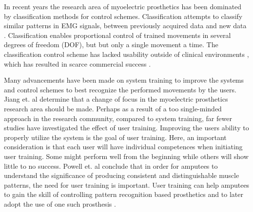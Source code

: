 In recent years the research area of myoelectric prosthetics has been dominated by classification methods for control schemes. Classification attempts to classify similar patterns in EMG signals, between previously acquired data and new data \cite{Mendez2017}. Classification enables proportional control of trained movements in several degrees of freedom (DOF), but but only a single movement a time. The classification control scheme has lacked usability outside of clinical environments \cite{Scheme2010}, which has resulted in scarce commercial success \cite{Jiang2012}.

Many advancements have been made on system training to improve the systems and control schemes to best recognize the performed movements by the users. Jiang et. al \cite{Jiang2012} determine that a change of focus in the myoelectric prosthetics research area should be made. Perhaps as a result of a too single-minded approach in the research community, compared to system training, far fewer studies have investigated the effect of user training. 
Improving the users ability to properly utilize the system is the goal of user training. Here, an important consideration is that each user will have individual competences when initiating user training. Some might perform well from the beginning while others will show little to no success. \cite{Powell2013} Powell et. al \cite{Powell2013} conclude that in order for amputees to understand the significance of producing consistent and distinguishable muscle patterns, the need for user training is important. User training can help amputees to gain the skill of controlling pattern recognition based prosthetics and to later adopt the use of one such prosthesis \cite{Powell2013}.

